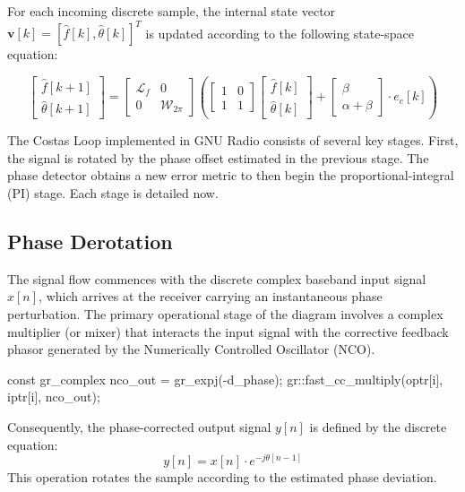 For each incoming discrete sample, the internal state vector $\bm{v}[k] = [\hat{f}[k], \hat{\theta}[k]]^T$ is updated according to the following state-space equation:

\begin{equation}
    \begin{bmatrix}
    \hat{f}[k+1] \\
    \hat{\theta}[k+1]
    \end{bmatrix}
    =
    \begin{bmatrix}
    \mathcal{L}_f & 0 \\
    0 & \mathcal{W}_{2\pi}
    \end{bmatrix}
    \left(
    \begin{bmatrix}
    1 & 0 \\
    1 & 1
    \end{bmatrix}
    \begin{bmatrix}
    \hat{f}[k] \\
    \hat{\theta}[k]
    \end{bmatrix}
    +
    \begin{bmatrix}
    \beta \\
    \alpha + \beta
    \end{bmatrix}
    \cdot e_c[k]
    \right)
\end{equation}

The Costas Loop implemented in GNU Radio consists of several key stages. First, the signal is rotated by the phase offset estimated in the previous stage. The phase detector obtains a new error metric to then begin the proportional-integral (PI) stage. Each stage is detailed now.

\subsection{Phase Derotation}

The signal flow commences with the discrete complex baseband input signal $x[n]$, which arrives at the receiver carrying an instantaneous phase perturbation. The primary operational stage of the diagram involves a complex multiplier (or mixer) that interacts the input signal with the corrective feedback phasor generated by the Numerically Controlled Oscillator (NCO). 
\begin{cpp}
const gr_complex nco_out = gr_expj(-d_phase);
gr::fast_cc_multiply(optr[i], iptr[i], nco_out);
\end{cpp}

\vspace{-2.25mm}
Consequently, the phase-corrected output signal $y[n]$ is defined by the discrete equation:
$$y[n] = x[n] \cdot e^{-j\theta[n-1]}$$
This operation rotates the sample according to the estimated phase deviation.

